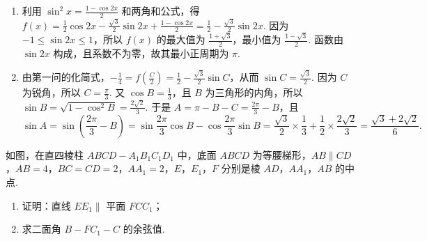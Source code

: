\begin{solution}
\begin{enumerate}
\item 利用 \(\sin^2x=\frac{1-\cos2x}{2}\) 和两角和公式，得 \(\displaystyle f(x)=\frac12\cos2x-\frac{\sqrt3}{2}\sin2x+\frac{1-\cos2x}{2}=\frac12-\frac{\sqrt3}{2}\sin2x\). 因为 \(-1\leqslant\sin2x\leqslant1\)，所以 \(f(x)\) 的最大值为 \(\frac{1+\sqrt3}{2}\)，最小值为 \(\frac{1-\sqrt3}{2}\). 函数由 \(\sin2x\) 构成，且系数不为零，故其最小正周期为 \(\pi\).
\item 由第一问的化简式，\(\displaystyle -\frac14=f\left(\frac C2\right)=\frac12-\frac{\sqrt3}{2}\sin C\)，从而 \(\sin C=\frac{\sqrt3}{2}\). 因为 \(C\) 为锐角，所以 \(C=\frac\pi3\). 又 \(\cos B=\frac13\)，且 \(B\) 为三角形的内角，所以 \(\sin B=\sqrt{1-\cos^2B}=\frac{2\sqrt2}{3}\). 于是 \(A=\pi-B-C=\frac{2\pi}{3}-B\)，且
\[
\sin A=\sin\left(\frac{2\pi}{3}-B\right)=\sin\frac{2\pi}{3}\cos B-\cos\frac{2\pi}{3}\sin B=\frac{\sqrt3}{2}\times\frac13+\frac12\times\frac{2\sqrt2}{3}=\frac{\sqrt3+2\sqrt2}{6}.
\]
\end{enumerate}
\end{solution}

\begin{problem}
如图，在直四棱柱 \(ABCD - A_{1}B_{1}C_{1}D_{1}\) 中，底面 \(ABCD\) 为等腰梯形，\(AB\parallel CD\)，\(AB = 4\)，\(BC = CD = 2\)，\(AA_{1} = 2\)，\(E\)，\(E_{1}\)，\(F\) 分别是棱 \(AD\)，\(AA_{1}\)，\(AB\) 的中点.

\begin{enumerate}
\item 证明：直线 \(EE_{1}\parallel\) 平面 \(FCC_{1}\)；
\item 求二面角 \(B - FC_{1} - C\) 的余弦值.
\end{enumerate}

\end{problem}


